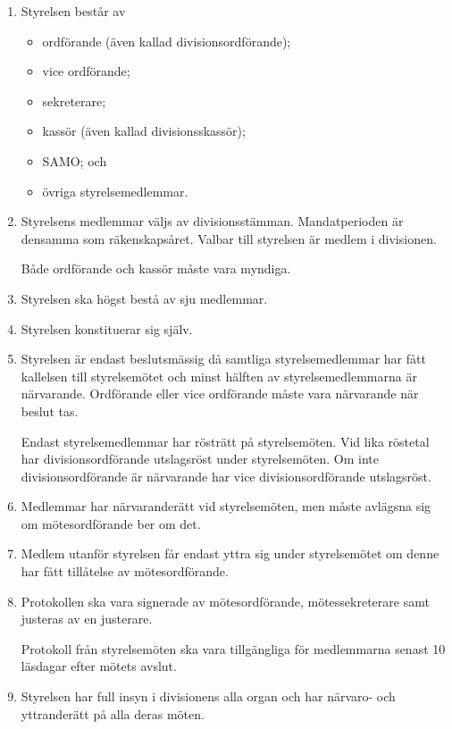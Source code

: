\documentclass{dvd}
\begin{document}
	\begin{enumerate}[label=\arabic* §, ref=\arabic*]
		\item Styrelsen består av

		\begin{itemize}
			\item ordförande (även kallad divisionsordförande);

			\item vice ordförande;

			\item sekreterare;

			\item kassör (även kallad divisionsskassör);

			\item SAMO; och

			\item övriga styrelsemedlemmar.
		\end{itemize}

		\item Styrelsens medlemmar väljs av divisionsstämman.
		Mandatperioden är densamma som räkenskapsåret.
		Valbar till styrelsen är medlem i divisionen.

		Både ordförande och kassör måste vara myndiga.

		\item Styrelsen ska högst bestå av sju medlemmar.

		\item Styrelsen konstituerar sig själv.

		\item Styrelsen är endast beslutsmässig då samtliga styrelsemedlemmar har fått kallelsen till styrelsemötet och minst hälften av styrelsemedlemmarna är närvarande.
		Ordförande eller vice ordförande måste vara närvarande när beslut tas.
		
		Endast styrelsemedlemmar har rösträtt på styrelsemöten.
		Vid lika röstetal har divisionsordförande utslagsröst under styrelsemöten.
		Om inte divisionsordförande är närvarande har vice divisionsordförande utslagsröst.

		\item Medlemmar har närvaranderätt vid styrelsemöten, men måste avlägsna sig om mötesordförande ber om det.

		\item Medlem utanför styrelsen får endast yttra sig under styrelsemötet om denne har fått tillåtelse av mötesordförande.

		\item Protokollen ska vara signerade av mötesordförande, mötessekreterare samt justeras av en justerare.

		Protokoll från styrelsemöten ska vara tillgängliga för medlemmarna senast 10 läsdagar efter mötets avslut.

		\item Styrelsen har full insyn i divisionens alla organ och har närvaro- och yttranderätt på alla deras möten.
	\end{enumerate}
\end{document}
